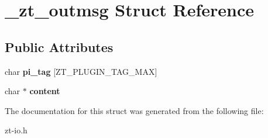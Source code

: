 \hypertarget{struct__zt__outmsg}{\section{\-\_\-zt\-\_\-outmsg Struct Reference}
\label{struct__zt__outmsg}
}
\subsection*{Public Attributes}
\begin{DoxyCompactItemize}
\item 
\hypertarget{struct__zt__outmsg_a77803b41f8a41761945e297603d234c3}{char {\bfseries pi\-\_\-tag} \mbox{[}Z\-T\-\_\-\-P\-L\-U\-G\-I\-N\-\_\-\-T\-A\-G\-\_\-\-M\-A\-X\mbox{]}}\label{struct__zt__outmsg_a77803b41f8a41761945e297603d234c3}

\item 
\hypertarget{struct__zt__outmsg_aa8c5ede005f9a0648306ffdc95a9f7b0}{char $\ast$ {\bfseries content}}\label{struct__zt__outmsg_aa8c5ede005f9a0648306ffdc95a9f7b0}

\end{DoxyCompactItemize}


The documentation for this struct was generated from the following file\-:\begin{DoxyCompactItemize}
\item 
zt-\/io.\-h\end{DoxyCompactItemize}
